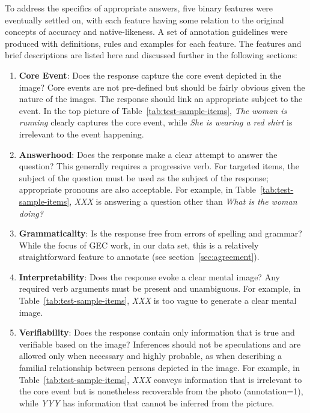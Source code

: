 \documentclass[11pt,a4paper]{article}
\begin{document}
To address the specifics of appropriate answers, five binary features were eventually settled on, with each feature having some relation to the original concepts of accuracy and native-likeness. A set of annotation guidelines were produced with definitions, rules and examples for each feature. The features and brief descriptions are listed here and discussed further in the following sections:

\begin{enumerate}
\item \textbf{Core Event}: Does the response capture the core event depicted in the image? Core events are not pre-defined but should be fairly obvious given the nature of the images. The response should link an appropriate subject to the event.  In the top picture of Table~\ref{tab:test-sample-items}, \textit{The woman is running} clearly captures the core event, while \textit{She is wearing a red shirt} is irrelevant to the event happening.
\item \textbf{Answerhood}: Does the response make a clear attempt to answer the question? This generally requires a progressive verb. For targeted items, the subject of the question must be used as the subject of the response; appropriate pronouns are also acceptable.  For example, in Table~\ref{tab:test-sample-items}, \textit{XXX} is answering a question other than \textit{What is the woman doing?}
\item \textbf{Grammaticality}: Is the response free from errors of spelling and grammar?  While the focus of GEC work, in our data set, this is a relatively straightforward feature to annotate (see section~\ref{sec:agreement}).
\item \textbf{Interpretability}: Does the response evoke a clear mental image? Any required verb arguments must be present and unambiguous.  For example, in Table~\ref{tab:test-sample-items}, \textit{XXX} is too vague to generate a clear mental image.
\item \textbf{Verifiability}: Does the response contain only information that is true and verifiable based on the image? Inferences should not be speculations and are allowed only when necessary and highly probable, as when describing a familial relationship between persons depicted in the image.  For example, in Table~\ref{tab:test-sample-items}, \textit{XXX} conveys information that is irrelevant to the core event but is nonetheless recoverable from the photo (annotation=1), while \textit{YYY} has information that cannot be inferred from the picture.
\end{enumerate}
\end{document}
